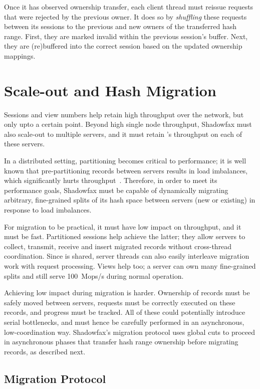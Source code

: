 Once it has observed ownership transfer, each client thread must reissue
requests that were rejected by the previous owner.
%
It does so by \emph{shuffling} these requests between its sessions to the
previous and new owners of the transferred hash range.
%
First, they are marked invalid within the previous session's
buffer.
%
Next, they are (re)buffered into the correct session based on
the updated ownership mappings.

\section{Scale-out and Hash Migration}
\label{sec:scale-out}

Sessions and view numbers help retain high throughput over the network,
but only upto a certain point.
%
Beyond high single node throughput, Shadowfax must also scale-out to
multiple servers, and it must retain \faster's throughput on each
of these servers.

In a distributed setting, partitioning becomes critical to
performance; it is well known that pre-partitioning records between
servers results in load imbalances, which significantly hurts
throughput~\cite{dynamo,slicer}.
%
Therefore, in order to meet its performance goals, Shadowfax must be
capable of dynamically migrating arbitrary, fine-grained splits of its
hash space between servers (new or existing) in response to load
imbalances.

For migration to be practical, it must have low impact on
throughput, and it must be fast.
%
Partitioned sessions help achieve the latter; they allow servers to
collect, transmit, receive and insert migrated records without
cross-thread coordination.
%
Since \faster is shared, server threads can also
easily interleave migration work with request processing.
%
Views help too; a server can own many fine-grained splits and still
serve 100~Mops/s during normal operation.

Achieving low impact during migration is harder.
%
Ownership of records must be safely moved between servers,
requests must be correctly executed on these records, and progress must
be tracked.
%
All of these could potentially introduce serial bottlenecks, and must
hence be carefully performed in an asynchronous, low-coordination way.
%
Shadowfax's migration protocol uses global cuts to proceed in
asynchronous phases
that transfer hash range ownership before migrating
records, as described next.

\subsection{Migration Protocol}

